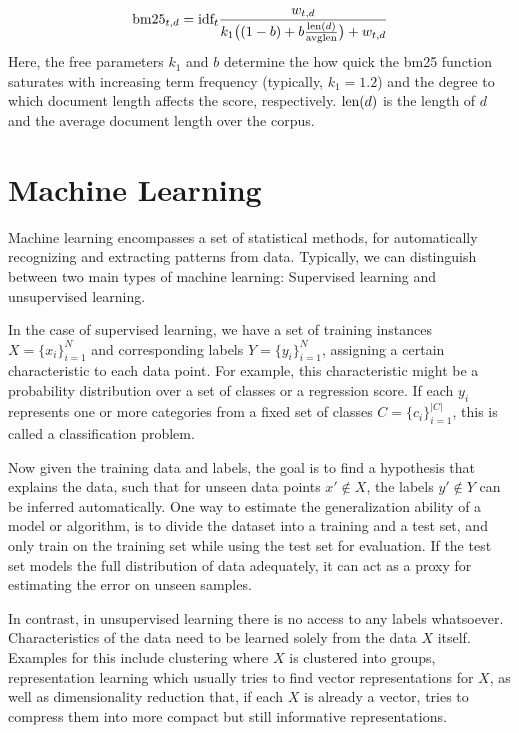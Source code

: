 \begin{equation}
    \text{bm25}_{t,d} = \text{idf}_t \frac{w_{t,d}}{k_1 \big((1 - b) + b \frac{\text{len}(d)}{\text{avglen}}\big) + w_{t,d}}
\end{equation}
Here, the free parameters $k_1$ and $b$ determine the how quick the bm25 function saturates with increasing term frequency (typically, $k_1=1.2$) and the degree to which document length affects the score, respectively. $\text{len}(d)$ is the length of $d$ and  the average document length over the corpus.

\section{Machine Learning}
\label{sec:ml}
Machine learning encompasses a set of statistical methods, for automatically recognizing and extracting patterns from data. Typically, we can distinguish between two main types of machine learning: Supervised learning and unsupervised learning.

In the case of supervised learning, we have a set of training instances $X = \{x_i\}_{i=1}^N$ and corresponding labels $Y = \{y_i\}_{i=1}^N$, assigning a certain characteristic to each data point. For example, this characteristic might be a probability distribution over a set of classes or a regression score. If each $y_i$ represents one or more categories from a fixed set of classes $C = \{c_i\}_{i=1}^{|C|}$, this is called a classification problem.

Now given the training data and labels, the goal is to find a hypothesis that explains the data, such that for unseen data points $x' \notin X$, the labels $y' \notin Y$ can be inferred automatically. One way to estimate the generalization ability of a model or algorithm, is to divide the dataset into a training and a test set, and only train on the training set while using the test set for evaluation. If the test set models the full distribution of data adequately, it can act as a proxy for estimating the error on unseen samples.

In contrast, in unsupervised learning there is no access to any labels whatsoever. Characteristics of the data need to be learned solely from the data $X$ itself. Examples for this include clustering where $X$ is clustered into groups, representation learning which usually tries to find vector representations for $X$, as well as dimensionality reduction that, if each $X$ is already a vector, tries to compress them into more compact but still informative representations.

